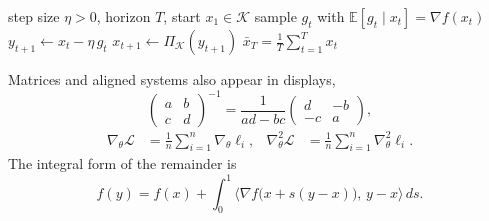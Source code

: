 \begin{algorithm}[t]
\caption{Projected stochastic gradient descent}
\label{alg:psgd}
\begin{algorithmic}[1]
\Require step size $\eta > 0$, horizon $T$, start $x_1 \in \mathcal{K}$
\State sample $g_t$ with $\mathbb{E}[g_t \mid x_t] = \nabla f(x_t)$
\State $y_{t+1} \gets x_t - \eta\, g_t$
\State $x_{t+1} \gets \Pi_{\mathcal{K}}(y_{t+1})$
\EndFor
\State \Return $\bar{x}_T = \frac{1}{T}\sum_{t=1}^{T} x_t$
\end{algorithmic}
\end{algorithm}

\proseB
Matrices and aligned systems also appear in displays,
\begin{equation}\label{eq:matrix}
\begin{pmatrix} a & b \\ c & d \end{pmatrix}^{-1} = \frac{1}{ad - bc}\begin{pmatrix} d & -b \\ -c & a \end{pmatrix},
\end{equation}
\begin{align*}
\nabla_\theta \mathcal{L} &= \frac{1}{n} \sum_{i=1}^n \nabla_\theta \ell_i, &
\nabla^2_\theta \mathcal{L} &= \frac{1}{n} \sum_{i=1}^n \nabla^2_\theta \ell_i.
\end{align*}
\proseC
The integral form of the remainder is
\begin{equation}\label{eq:int}
f(y) = f(x) + \int_0^1 \bigl\langle \nabla f\bigl(x + s(y-x)\bigr),\, y - x \bigr\rangle \, ds.
\end{equation}
\proseA

